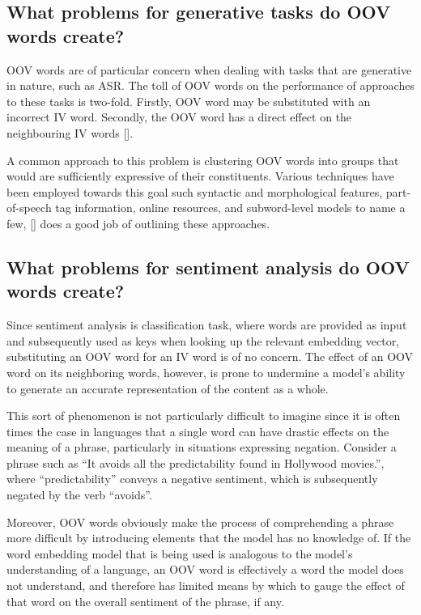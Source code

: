 \documentclass[12pt, a4paper]{report}
\theoremstyle{definition}
\theoremstyle{definition}%
\theoremstyle{definition}%
\theoremstyle{definition}%
\theoremstyle{definition}%
\theoremstyle{definition}%
\renewcommand{\cite}[1]{[\citealp{#1}]}
\begin{document}
\subsection{What problems for generative tasks do OOV words create?}
OOV words are of particular concern when dealing with tasks that are generative in nature, such as ASR. The toll of OOV words on the performance of approaches to these tasks is two-fold. Firstly, OOV word may be substituted with an incorrect IV word. Secondly, the OOV word has a direct effect on the neighbouring IV words \cite{naptali2012}.

A common approach to this problem is clustering OOV words into groups that would are sufficiently expressive of their constituents. Various techniques have been employed towards this goal such syntactic and morphological features, part-of-speech tag information, online resources, and subword-level models to name a few, \cite{naptali2012} does a good job of outlining these approaches.

\subsection{What problems for sentiment analysis do OOV words create?}
Since sentiment analysis is classification task, where words are provided as input and subsequently used as keys when looking up the relevant embedding vector, substituting an OOV word for an IV word is of no concern. The effect of an OOV word on its neighboring words, however, is prone to undermine a model's ability to generate an accurate representation of the content as a whole.

This sort of phenomenon is not particularly difficult to imagine since it is often times the case in languages that a single word can have drastic effects on the meaning of a phrase, particularly in situations expressing negation. Consider a phrase such as \enquote{It avoids all the predictability found in Hollywood movies.}, where \enquote{predictability} conveys a negative sentiment, which is subsequently negated by the verb \enquote{avoids}.

Moreover, OOV words obviously make the process of comprehending a phrase more difficult by introducing elements that the model has no knowledge of. If the word embedding model that is being used is analogous to the model's understanding of a language, an OOV word is effectively a word the model does not understand, and therefore has limited means by which to gauge the effect of that word on the overall sentiment of the phrase, if any.
\end{document}
